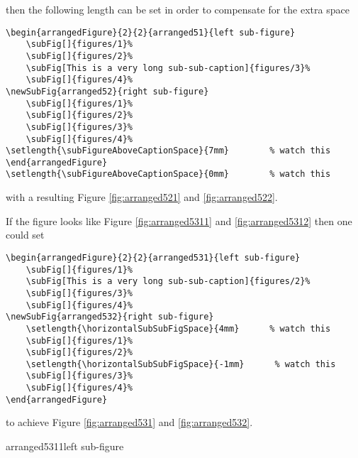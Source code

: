 \documentclass[12pt,a4paper]{article}
\begin{document}
then the following length can be set in order to compensate for the extra space

\begin{verbatim}
\begin{arrangedFigure}{2}{2}{arranged51}{left sub-figure}
    \subFig[]{figures/1}%
    \subFig[]{figures/2}%
    \subFig[This is a very long sub-sub-caption]{figures/3}%
    \subFig[]{figures/4}%
\newSubFig{arranged52}{right sub-figure}
    \subFig[]{figures/1}%
    \subFig[]{figures/2}%
    \subFig[]{figures/3}%
    \subFig[]{figures/4}%
\setlength{\subFigureAboveCaptionSpace}{7mm}        % watch this
\end{arrangedFigure}
\setlength{\subFigureAboveCaptionSpace}{0mm}        % watch this
\end{verbatim}


with a resulting Figure \ref{fig:arranged521} and \ref{fig:arranged522}.

If the figure looks like Figure \ref{fig:arranged5311} and \ref{fig:arranged5312} 
then one could set

\begin{verbatim}
\begin{arrangedFigure}{2}{2}{arranged531}{left sub-figure}
    \subFig[]{figures/1}%
    \subFig[This is a very long sub-sub-caption]{figures/2}%
    \subFig[]{figures/3}%
    \subFig[]{figures/4}%
\newSubFig{arranged532}{right sub-figure}
    \setlength{\horizontalSubSubFigSpace}{4mm}      % watch this
    \subFig[]{figures/1}%
    \subFig[]{figures/2}%
    \setlength{\horizontalSubSubFigSpace}{-1mm}      % watch this
    \subFig[]{figures/3}%
    \subFig[]{figures/4}%
\end{arrangedFigure}
\end{verbatim}

to achieve Figure \ref{fig:arranged531} and \ref{fig:arranged532}.



\begin{arrangedFigure}{2}{2}{arranged5311}{left sub-figure}
    \setlength{\horizontalSubSubFigSpace}{4mm}
    \setlength{\horizontalSubSubFigSpace}{-1mm}
\end{arrangedFigure}
\end{document}
